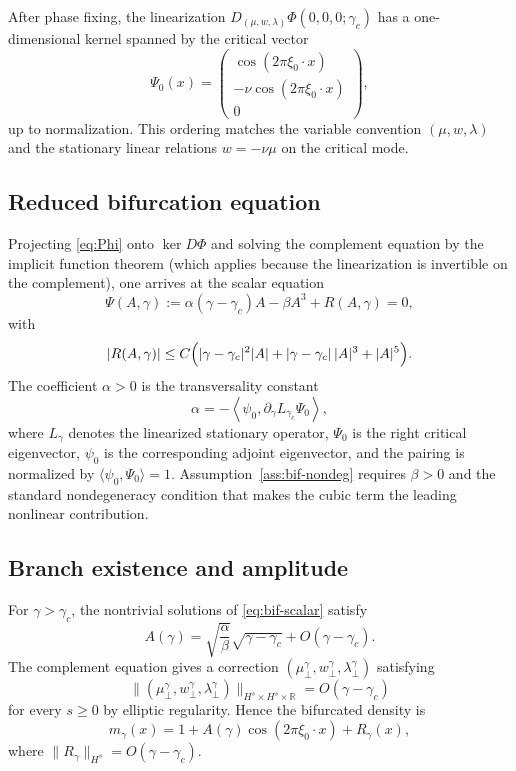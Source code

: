 \documentclass[11pt]{amsart}
\theoremstyle{definition}
\theoremstyle{remark}
\newcommand{\R}{\mathbb{R}}
\newcommand{\gamc}{\gamma_c}
\begin{document}
After phase fixing, the linearization
$D_{(\mu,w,\lambda)}\Phi(0,0,0;\gamc)$ has a one-dimensional kernel spanned by the critical vector
\begin{equation}
\label{eq:crit-eigvec}
\Psi_0(x) =
\begin{pmatrix}
\cos(2\pi\xi_0\cdot x)\\
-\nu\cos(2\pi\xi_0\cdot x)\\
0
\end{pmatrix},
\end{equation}
up to normalization. This ordering matches the variable convention $(\mu,w,\lambda)$ and the stationary linear relations $w=-\nu\mu$ on the critical mode.

\subsection{Reduced bifurcation equation}
\label{sub:reduced-bif}

Projecting \eqref{eq:Phi} onto $\ker D\Phi$ and solving the complement equation by the implicit function theorem (which applies because the linearization is invertible on the complement), one arrives at the scalar equation
\begin{equation}
\label{eq:bif-scalar}
\Psi(A,\gamma) := \alpha(\gamma-\gamc)A - \beta A^3 + R(A,\gamma)=0,
\end{equation}
with
\[
|R(A,\gamma)|\le C\Bigl(|\gamma-\gamc|^2|A| + |\gamma-\gamc|\,|A|^3 + |A|^5\Bigr).
\]
The coefficient $\alpha>0$ is the transversality constant
\[
\alpha = -\left\langle \psi_0, \partial_\gamma L_{\gamc}\Psi_0\right\rangle,
\]
where $L_{\gamma}$ denotes the linearized stationary operator, $\Psi_0$ is the right critical eigenvector, $\psi_0$ is the corresponding adjoint eigenvector, and the pairing is normalized by $\langle \psi_0,\Psi_0\rangle=1$.
Assumption~\ref{ass:bif-nondeg} requires $\beta>0$ and the standard nondegeneracy condition that makes the cubic term the leading nonlinear contribution.

\subsection{Branch existence and amplitude}
\label{sub:branch}

For $\gamma>\gamc$, the nontrivial solutions of \eqref{eq:bif-scalar} satisfy
\begin{equation}
\label{eq:amp-branch}
A(\gamma) = \sqrt{\frac{\alpha}{\beta}}\sqrt{\gamma-\gamc}+O(\gamma-\gamc).
\end{equation}
The complement equation gives a correction
$(\mu_\perp^\gamma,w_\perp^\gamma,\lambda_\perp^\gamma)$ satisfying
\[
\|(\mu_\perp^\gamma,w_\perp^\gamma,\lambda_\perp^\gamma)\|_{H^s\times H^s\times \R}
=O(\gamma-\gamc)
\]
for every $s\ge 0$ by elliptic regularity. Hence the bifurcated density is
\[
m_\gamma(x)=1+A(\gamma)\cos(2\pi\xi_0\cdot x)+R_\gamma(x),
\]
where $\|R_\gamma\|_{H^s}=O(\gamma-\gamc)$.
\end{document}
